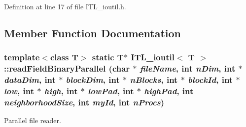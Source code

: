 Definition at line 17 of file ITL\_\-ioutil.h.



\subsection{Member Function Documentation}
\hypertarget{classITL__ioutil_a64c092f58c5d77ab115ddb140f9744cd}{
\subsubsection[{readFieldBinaryParallel}]{\setlength{\rightskip}{0pt plus 5cm}template$<$class T$>$ static T$\ast$ {\bf ITL\_\-ioutil}$<$ T $>$::readFieldBinaryParallel (char $\ast$ {\em fileName}, \/  int {\em nDim}, \/  int $\ast$ {\em dataDim}, \/  int $\ast$ {\em blockDim}, \/  int $\ast$ {\em nBlocks}, \/  int $\ast$ {\em blockId}, \/  int $\ast$ {\em low}, \/  int $\ast$ {\em high}, \/  int $\ast$ {\em lowPad}, \/  int $\ast$ {\em highPad}, \/  int {\em neighborhoodSize}, \/  int {\em myId}, \/  int {\em nProcs})}}
\label{classITL__ioutil_a64c092f58c5d77ab115ddb140f9744cd}


Parallel file reader. 

